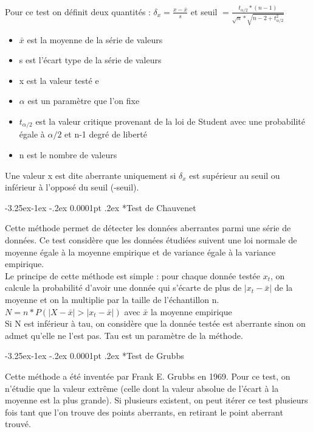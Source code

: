 \documentclass[a4paper,12pt]{article} %
\makeatletter
\renewcommand\subparagraph{\@startsection{subparagraph}{5}{\z@}%
                                      {-3.25ex\@plus -1ex \@minus -.2ex}%
                                      {0.0001pt \@plus .2ex}%
                                      {\normalfont\normalsize\bfseries}}
\makeatother
\begin{document}
                    
                    Pour ce test on définit deux quantités : $\delta_x=\frac{x-\bar{x}}{s}$ et seuil $=\frac{t_{\alpha/2}*(n-1)}{\sqrt{n}*\sqrt{n-2+t^2_{\alpha/2}}}$
                    \begin{itemize}
                    \item $\bar{x}$ est la moyenne de la série de valeurs
                    \item 	s est l'écart type de la série de valeurs
                    \item 	x est la valeur testé e
                    \item $\alpha$ est un paramètre que l'on fixe
                    \item $t_{\alpha/2}$ est la valeur critique provenant de la loi de Student avec une probabilité égale à  $\alpha/2$ et n-1 degré de liberté 
                    \item n est le nombre de valeurs 
                    \end{itemize}
                    Une valeur x est dite aberrante uniquement si $\delta_x$ est supérieur au seuil ou inférieur à l'opposé du seuil (-seuil).

					\subparagraph*{Test de Chauvenet}
                    					
                    Cette méthode permet de détecter les données aberrantes parmi une série de données. Ce test  considère que les données étudiées suivent une loi normale de moyenne égale à la moyenne empirique et de variance égale à la variance empirique.\\
                    
                    Le principe de cette méthode est simple : pour chaque donnée testée $x_t$, on calcule la probabilité d'avoir une donnée qui s'écarte de plus de $|x_t-\bar{x}|$ de la moyenne et on la multiplie par la taille de l'échantillon n.\\
                    	$N = n*P( |X-\bar{x}|>|x_t-\bar{x}|)$ avec $\bar{x}$ la moyenne empirique\\
                    	Si N est inférieur à tau, on considère que la donnée testée est aberrante sinon on admet qu'elle ne l'est pas. Tau est un paramètre de la méthode. 
                    					   
					\subparagraph*{Test de Grubbs}
                        					
                        Cette méthode a été inventée par Frank E. Grubbs en 1969. Pour ce test, on n’étudie que la valeur extrême (celle dont la valeur absolue de l’écart à la moyenne est la plus grande). Si plusieurs existent, on peut itérer ce test plusieurs fois tant que l'on trouve des points aberrants, en retirant le point aberrant trouvé. \\
                        
\end{document}
